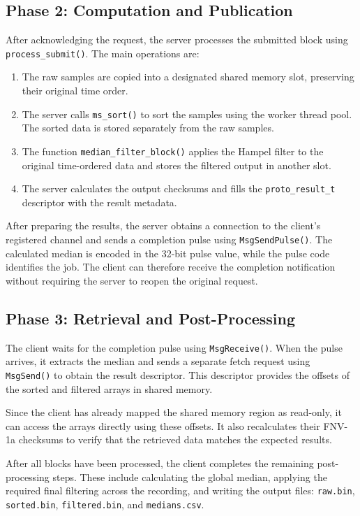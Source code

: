 \documentclass[12pt,a4paper,oneside]{report}
\begin{document}
\subsection{Phase 2: Computation and Publication}

After acknowledging the request, the server processes the submitted block using \texttt{process\_submit()}. The main operations are:

\begin{enumerate}
    \item The raw samples are copied into a designated shared memory slot, preserving their original time order.
    \item The server calls \texttt{ms\_sort()} to sort the samples using the worker thread pool. The sorted data is stored separately from the raw samples.
    \item The function \texttt{median\_filter\_block()} applies the Hampel filter to the original time-ordered data and stores the filtered output in another slot.
    \item The server calculates the output checksums and fills the \texttt{proto\_result\_t} descriptor with the result metadata.
\end{enumerate}

After preparing the results, the server obtains a connection to the client's registered channel and sends a completion pulse using \texttt{MsgSendPulse()}. The calculated median is encoded in the 32-bit pulse value, while the pulse code identifies the job. The client can therefore receive the completion notification without requiring the server to reopen the original request.

\subsection{Phase 3: Retrieval and Post-Processing}

The client waits for the completion pulse using \texttt{MsgReceive()}. When the pulse arrives, it extracts the median and sends a separate fetch request using \texttt{MsgSend()} to obtain the result descriptor. This descriptor provides the offsets of the sorted and filtered arrays in shared memory.

Since the client has already mapped the shared memory region as read-only, it can access the arrays directly using these offsets. It also recalculates their FNV-1a checksums to verify that the retrieved data matches the expected results.

After all blocks have been processed, the client completes the remaining post-processing steps. These include calculating the global median, applying the required final filtering across the recording, and writing the output files: \texttt{raw.bin}, \texttt{sorted.bin}, \texttt{filtered.bin}, and \texttt{medians.csv}.
\end{document}
